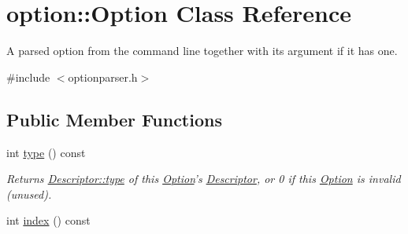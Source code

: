 \hypertarget{classoption_1_1_option}{\section{option\-:\-:\-Option \-Class \-Reference}
\label{classoption_1_1_option}
}


\-A parsed option from the command line together with its argument if it has one.  




{\ttfamily \#include $<$optionparser.\-h$>$}

\subsection*{\-Public \-Member \-Functions}
\begin{DoxyCompactItemize}
\item 
int \hyperlink{classoption_1_1_option_a6560fa0526e2affd87d5a10622336af4}{type} () const 
\begin{DoxyCompactList}\small\item\em \-Returns \hyperlink{structoption_1_1_descriptor_a1b220dabd8aad075fa441a80f9b9343c}{\-Descriptor\-::type} of this \hyperlink{classoption_1_1_option}{\-Option}'s \hyperlink{structoption_1_1_descriptor}{\-Descriptor}, or 0 if this \hyperlink{classoption_1_1_option}{\-Option} is invalid (unused). \end{DoxyCompactList}\item 
\hypertarget{classoption_1_1_option_ac0acba91bbfcca0c35cfc54f197b15d2}{int \hyperlink{classoption_1_1_option_ac0acba91bbfcca0c35cfc54f197b15d2}{index} () const }\label{classoption_1_1_option_ac0acba91bbfcca0c35cfc54f197b15d2}


\end{DoxyCompactItemize}
